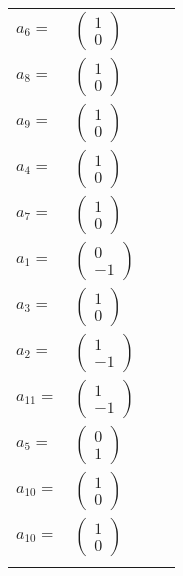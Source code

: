 \documentclass[1p]{elsarticle_modified}
\theoremstyle{definition}
\begin{document}
\begin{tabular}{m{7pt} m{180pt} m{7pt} m{180pt} }
\flushright $a_{6}=$&$\begin{pmatrix}1\\0\end{pmatrix}$ \\
\flushright $a_{8}=$&$\begin{pmatrix}1\\0\end{pmatrix}$ \\
\flushright $a_{9}=$&$\begin{pmatrix}1\\0\end{pmatrix}$ \\
\flushright $a_{4}=$&$\begin{pmatrix}1\\0\end{pmatrix}$ \\
\flushright $a_{7}=$&$\begin{pmatrix}1\\0\end{pmatrix}$ \\
\flushright $a_{1}=$&$\begin{pmatrix}0\\-1\end{pmatrix}$ \\
\flushright $a_{3}=$&$\begin{pmatrix}1\\0\end{pmatrix}$ \\
\flushright $a_{2}=$&$\begin{pmatrix}1\\-1\end{pmatrix}$ \\
\flushright $a_{11}=$&$\begin{pmatrix}1\\-1\end{pmatrix}$ \\
\flushright $a_{5}=$&$\begin{pmatrix}0\\1\end{pmatrix}$ \\
\flushright $a_{10}=$&$\begin{pmatrix}1\\0\end{pmatrix}$\\ \flushright $a_{10}=$&$\begin{pmatrix}1\\0\end{pmatrix}$\\&\end{tabular}
\end{document}

